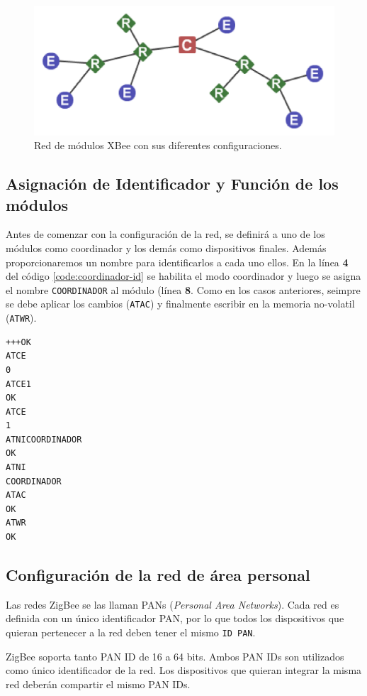 \documentclass[11pt,oneside,spanish,a4paper]{article}
\begin{document}
\begin{figure}[ht]
  \centering
  \includegraphics[width=.8\textwidth]{img/xbee-topo}
  \caption{Red de módulos XBee con sus diferentes configuraciones.}
  \label{fig:xbee-red}
\end{figure}

\subsection{Asignación de Identificador y Función de los módulos}

Antes de comenzar con la configuración de la red, se definirá a uno de
los módulos como coordinador y los demás como dispositivos
finales. Además proporcionaremos un nombre para identificarlos a cada
uno ellos. En la línea \textbf{4} del código
\ref{code:coordinador-id}  se habilita el modo coordinador y luego se
asigna el nombre \texttt{COORDINADOR} al módulo (línea \textbf{8}.
 Como en los casos anteriores, seimpre se debe aplicar los cambios (\texttt{ATAC}) y
finalmente escribir en la memoria no-volatil (\texttt{ATWR}).
\begin{lstlisting}[emph={+++,ATCE,ATCE1,ATWR,ATAC,ATNI,ATCOORDINADOR},
    emphstyle={\color{blue}}, caption={Obtención del \textsl{seral
number}.}, label=code:coordinador-id]
+++OK
ATCE
0
ATCE1
OK
ATCE
1
ATNICOORDINADOR
OK
ATNI
COORDINADOR
ATAC
OK
ATWR
OK
\end{lstlisting}  

\subsection{Configuración de la red de área personal}

Las redes ZigBee se las llaman PANs (\textsl{Personal Area
  Networks}). Cada red es definida con un único identificador PAN, por
lo que todos los dispositivos que quieran pertenecer a la red deben
tener el mismo \texttt{ID PAN}. 

ZigBee soporta tanto PAN ID de 16 a 64 bits. Ambos PAN IDs son
utilizados como único identificador de la red. Los dispositivos que
quieran integrar la misma red deberán compartir el mismo PAN IDs. 
\end{document}
